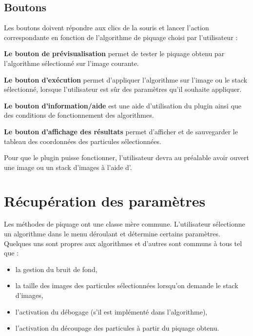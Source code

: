 \subsection{Boutons}

Les boutons doivent répondre aux clics de la souris et lancer l'action correspondante en fonction de l'algorithme de piquage choisi par l'utilisateur :

\begin{description}
\item \textbf{Le bouton de prévisualisation} permet de tester le piquage obtenu par l'algorithme sélectionné sur l'image courante.
\item \textbf{Le bouton d'exécution} permet d'appliquer l'algorithme sur l'image ou le stack sélectionné, lorsque l'utilisateur est s\^ur des paramètres qu'il souhaite appliquer.
\item \textbf{Le bouton d'information/aide} est une aide d'utilisation du plugin ainsi que des conditions de fonctionnement des algorithmes.
\item \textbf{Le bouton d'affichage des résultats} permet d'afficher et de sauvegarder le tableau des coordonnées des particules sélectionnées.%
\end{description}
Pour que le plugin puisse fonctionner, l'utilisateur devra au préalable avoir ouvert une image ou un stack d'images à l'aide d'\imj.
\pagebreak

\section{Récupération des paramètres}

Les méthodes de piquage ont une classe mère commune. L'utilisateur sélectionne un algorithme dans le menu déroulant et détermine certains paramètres. Quelques uns sont propres aux algorithmes et d'autres sont communs à tous tel que :

\begin{itemize}
\item la gestion du bruit de fond,
\item la taille des images des particules sélectionnées lorsqu'on demande le stack d'images,
\item l'activation du débogage (s'il est implémenté dans l'algorithme),
\item l'activation du découpage des particules à partir du piquage obtenu.
\end{itemize}

